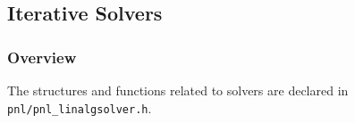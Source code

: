 



\subsection{Iterative Solvers}
\subsubsection{Overview}

The structures and functions related to solvers are declared in
\verb!pnl/pnl_linalgsolver.h!. 

